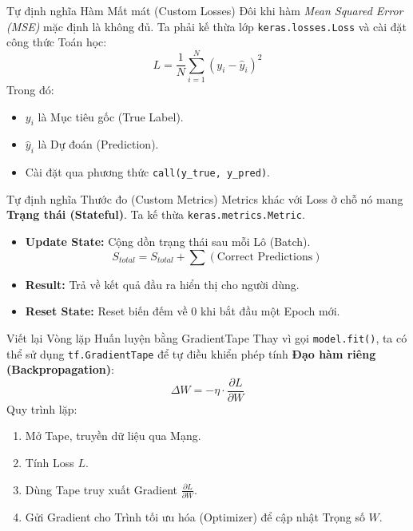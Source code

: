\documentclass[aspectratio=169]{beamer}
\begin{document}
\begin{frame}{Tự định nghĩa Hàm Mất mát (Custom Losses)}
    Đôi khi hàm \textit{Mean Squared Error (MSE)} mặc định là không đủ. Ta phải kế thừa lớp \texttt{keras.losses.Loss} và cài đặt công thức Toán học:
    \begin{equation}
        L = \frac{1}{N} \sum_{i=1}^{N} (y_i - \hat{y}_i)^2
    \end{equation}
    Trong đó:
    \begin{itemize}
        \item $y_i$ là Mục tiêu gốc (True Label).
        \item $\hat{y}_i$ là Dự đoán (Prediction).
        \item Cài đặt qua phương thức \texttt{call(y\_true, y\_pred)}.
    \end{itemize}
\end{frame}

\begin{frame}{Tự định nghĩa Thước đo (Custom Metrics)}
    Metrics khác với Loss ở chỗ nó mang \textbf{Trạng thái (Stateful)}. Ta kế thừa \texttt{keras.metrics.Metric}.
    \begin{itemize}
        \item \textbf{Update State:} Cộng dồn trạng thái sau mỗi Lô (Batch).
        \begin{equation}
            S_{total} = S_{total} + \sum (\text{Correct Predictions})
        \end{equation}
        \item \textbf{Result:} Trả về kết quả đầu ra hiển thị cho người dùng.
        \item \textbf{Reset State:} Reset biến đếm về 0 khi bắt đầu một Epoch mới.
    \end{itemize}
\end{frame}

\begin{frame}{Viết lại Vòng lặp Huấn luyện bằng GradientTape}
    Thay vì gọi \texttt{model.fit()}, ta có thể sử dụng \texttt{tf.GradientTape} để tự điều khiển phép tính \textbf{Đạo hàm riêng (Backpropagation)}:
    \begin{equation}
        \Delta W = - \eta \cdot \frac{\partial L}{\partial W}
    \end{equation}
    Quy trình lặp:
    \begin{enumerate}
        \item Mở Tape, truyền dữ liệu qua Mạng.
        \item Tính Loss $L$.
        \item Dùng Tape truy xuất Gradient $\frac{\partial L}{\partial W}$.
        \item Gửi Gradient cho Trình tối ưu hóa (Optimizer) để cập nhật Trọng số $W$.
    \end{enumerate}
\end{frame}
\end{document}
